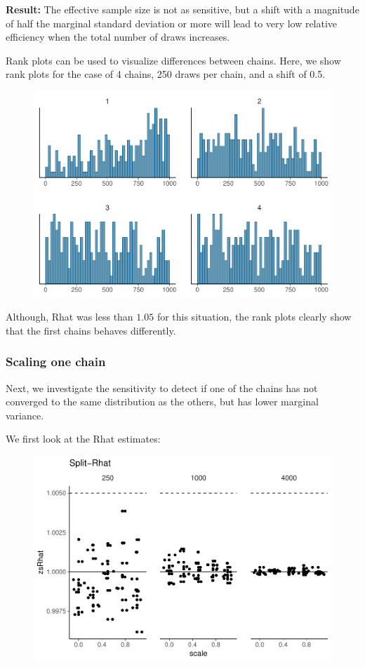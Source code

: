 \documentclass[american,]{article}
\begin{document}
\textbf{Result:} The effective sample size is not as sensitive, but a
shift with a magnitude of half the marginal standard deviation or more
will lead to very low relative efficiency when the total number of draws
increases.

Rank plots can be used to visualize differences between chains. Here, we
show rank plots for the case of 4 chains, 250 draws per chain, and a
shift of 0.5.

\begin{figure}[tp]
  \centering
  \includegraphics[width=0.6\linewidth]{graphics/hist-shifted-chain-1.pdf}
\end{figure}

Although, Rhat was less than \(1.05\) for this situation, the rank plots
clearly show that the first chains behaves differently.

\hypertarget{scaling-one-chain}{%
\subsubsection*{Scaling one chain}\label{scaling-one-chain}}

Next, we investigate the sensitivity to detect if one of the chains has
not converged to the same distribution as the others, but has lower
marginal variance.

We first look at the Rhat estimates:

\begin{figure}[tp]
  \centering
  \includegraphics[width=0.6\linewidth]{graphics/zsrhat-scaled-chain-1.pdf}
\end{figure}
\end{document}
